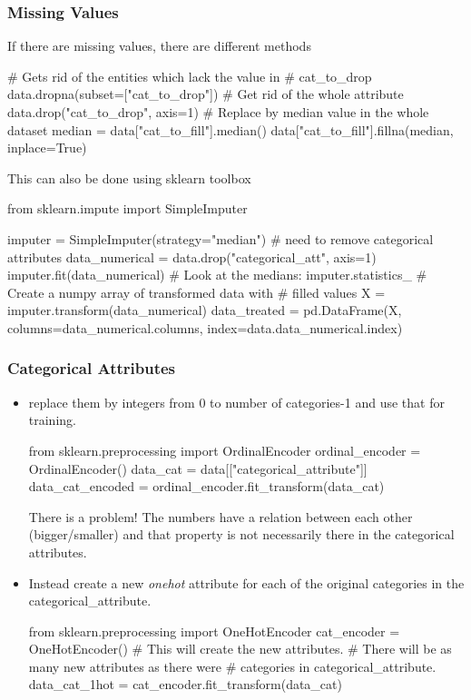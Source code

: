     \subsubsection*{Missing Values}
      If there are missing values, there are different methods
      \begin{python}
        # Gets rid of the entities which lack the value in
        # cat_to_drop
        data.dropna(subset=["cat_to_drop"])
        # Get rid of the whole attribute
        data.drop("cat_to_drop", axis=1)
        # Replace by median value in the whole dataset
        median = data["cat_to_fill"].median()
        data["cat_to_fill"].fillna(median, inplace=True)
      \end{python}
      This can also be done using sklearn toolbox
      \begin{python}
        from sklearn.impute import SimpleImputer

        imputer = SimpleImputer(strategy="median")
        # need to remove categorical attributes
        data_numerical = data.drop("categorical_att", axis=1)
        imputer.fit(data_numerical)
        # Look at the medians:
        imputer.statistics_
        # Create a numpy array of transformed data with
        # filled values
        X = imputer.transform(data_numerical)
        data_treated = pd.DataFrame(X,
                columns=data_numerical.columns,
                index=data.data_numerical.index)
      \end{python}


    \subsubsection*{Categorical Attributes}
      \begin{itemize}
        \item replace them by integers from 0 to number of categories-1 and use that for training.
          \begin{python}
            from sklearn.preprocessing import OrdinalEncoder
            ordinal_encoder = OrdinalEncoder()
            data_cat = data[["categorical_attribute"]]
            data_cat_encoded = ordinal_encoder.fit_transform(data_cat)
          \end{python}
          There is a problem! The numbers have a relation between each other (bigger/smaller) and that property is not necessarily there in the categorical attributes.
        \item Instead create a new \emph{onehot} attribute for each of the original categories in the categorical\_attribute.
          \begin{python}
            from sklearn.preprocessing import OneHotEncoder
            cat_encoder = OneHotEncoder()
            # This will create the new attributes.
            # There will be as many new attributes as there were
            # categories in categorical_attribute.
            data_cat_1hot = cat_encoder.fit_transform(data_cat)
          \end{python}
      \end{itemize}

